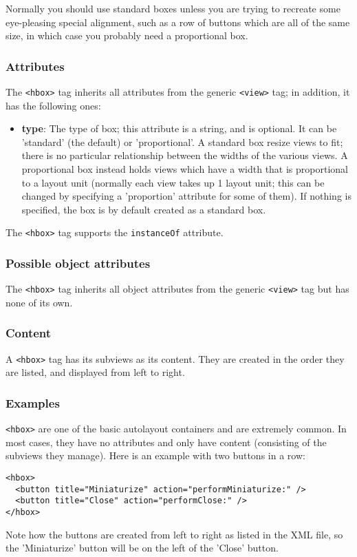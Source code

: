 Normally you should use standard boxes unless you are trying to
recreate some eye-pleasing special alignment, such as a row of buttons
which are all of the same size, in which case you probably need a
proportional box.

\subsubsection{Attributes}
The \texttt{<hbox>} tag inherits all attributes from the generic
\texttt{<view>} tag; in addition, it has the following ones:
\begin{itemize}
\item {\bf type}: The type of box; this attribute is a string, and is
  optional.  It can be 'standard' (the default) or 'proportional'.  A
  standard box resize views to fit; there is no particular
  relationship between the widths of the various views.  A
  proportional box instead holds views which have a width that is
  proportional to a layout unit (normally each view takes up 1 layout
  unit; this can be changed by specifying a 'proportion' attribute for
  some of them).  If nothing is specified, the box is by default
  created as a standard box.
\end{itemize}
The \texttt{<hbox>} tag supports the \texttt{instanceOf} attribute.

\subsubsection{Possible object attributes}
The \texttt{<hbox>} tag inherits all object attributes from the
generic \texttt{<view>} tag but has none of its own.

\subsubsection{Content}
A \texttt{<hbox>} tag has its subviews as its content.  They are
created in the order they are listed, and displayed from left to
right.

\subsubsection{Examples}
\texttt{<hbox>} are one of the basic autolayout containers and are
extremely common.  In most cases, they have no attributes and only
have content (consisting of the subviews they manage).  Here is an
example with two buttons in a row:
\begin{verbatim}
<hbox>
  <button title="Miniaturize" action="performMiniaturize:" />
  <button title="Close" action="performClose:" />
</hbox>
\end{verbatim}
Note how the buttons are created from left to right as listed in the
XML file, so the 'Miniaturize' button will be on the left of the
'Close' button.

